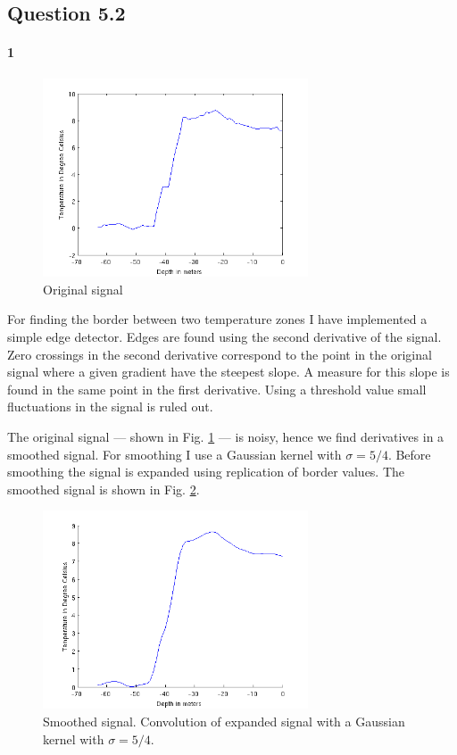 \documentclass[a4paper, 10pt, final]{article}
\begin{document}
\subsection*{Question 5.2}
\paragraph{1}

\begin{figure}[!h]
    \centering
    \includegraphics[angle=0,width=0.7\textwidth]{images/org_signal}
    \caption[]{Original signal}
    \label{org_signal}
\end{figure}

For finding the border between two temperature zones I have implemented
a simple edge detector. Edges are found using the second derivative of
the signal. Zero crossings in the second derivative correspond to the
point in the original signal where a given gradient have the steepest
slope. A measure for this slope is found in the same point in the first
derivative. Using a threshold value small fluctuations in the signal is
ruled out.

The original signal --- shown in Fig. \ref{org_signal} --- is noisy,
hence we find derivatives in a smoothed signal. For smoothing I use a
Gaussian kernel with $\sigma = 5/4$.  Before smoothing the signal is
expanded using replication of border values. The smoothed signal is
shown in Fig. \ref{blur_signal}.

\begin{figure}[!h]
    \centering
    \includegraphics[angle=0,width=0.7\textwidth]{images/blur_signal}
    \caption[]{Smoothed signal. Convolution of expanded signal with a
    Gaussian kernel with $\sigma = 5/4$.}
    \label{blur_signal}
\end{figure}
\end{document}

